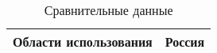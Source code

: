 
\begin{table}[h] %
	\caption{Сравнительные данные}
	\small
	\label{tabular:uses}
	\begin{center}
	\begin{tabular}{lc}
	\hline
	\multicolumn{1}{c}{Области использования}&Россия\\
	\hline

	\hline
	\end{tabular}
\end{center}
\end{table}
